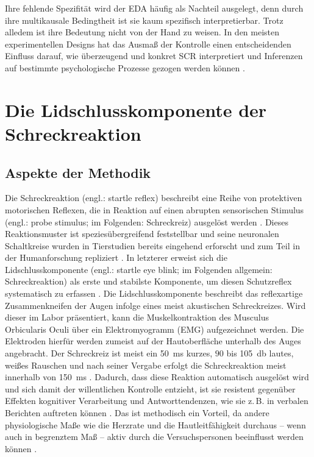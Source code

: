 		Ihre fehlende Spezifität wird der EDA häufig als Nachteil ausgelegt, denn durch ihre multikausale Bedingtheit ist sie kaum spezifisch interpretierbar. Trotz alledem ist ihre Bedeutung nicht von der Hand zu weisen. In den meisten experimentellen Designs hat das Ausmaß der Kontrolle einen entscheidenden Einfluss darauf, wie überzeugend und konkret SCR interpretiert und Inferenzen auf bestimmte psychologische Prozesse gezogen werden können \parencite{DAWSON2007b}. 
		
		


\section{Die Lidschlusskomponente der Schreckreaktion}		\label{startle}
		
	\subsection{Aspekte der Methodik}				\label{startlemethods}
		
		Die Schreckreaktion (engl.: startle reflex) beschreibt eine Reihe von protektiven motorischen Reflexen, die in Reaktion auf einen abrupten sensorischen Stimulus (engl.: probe stimulus; im Folgenden: Schreckreiz) ausgelöst werden \parencite{LANDIS1939}. Dieses Reaktionsmuster ist speziesübergreifend feststellbar und seine neuronalen Schaltkreise wurden in Tierstudien bereits eingehend erforscht und zum Teil in der Humanforschung repliziert \parencite[für eine Übersichtsarbeit siehe][]{DAVIS2006}. In letzterer erweist sich die Lidschlusskomponente (engl.: startle eye blink; im Folgenden allgemein: Schreckreaktion) als erste und stabilste Komponente, um diesen Schutzreflex systematisch zu erfassen \parencite{LANG1990}. Die Lidschlusskomponente beschreibt das reflexartige Zusammenkneifen der Augen infolge eines meist akustischen Schreckreizes. Wird dieser im Labor präsentiert, kann die Muskelkontraktion des Musculus Orbicularis Oculi über ein Elektromyogramm (EMG) aufgezeichnet werden. Die Elektroden hierfür werden zumeist auf der Hautoberfläche unterhalb des Auges angebracht. Der Schreckreiz ist meist ein \SI{50}{\milli\second} kurzes, $90$ bis \SI{105}{\decibel} lautes, weißes Rauschen und nach seiner Vergabe erfolgt die Schreckreaktion meist innerhalb von \SI{150}{\milli\second} \parencite{BLUMENTHAL2005}.
		Dadurch, dass diese Reaktion automatisch ausgelöst wird und sich damit der willentlichen Kontrolle entzieht, ist sie resistent gegenüber Effekten kognitiver Verarbeitung und Antworttendenzen, wie sie z.\,B. in verbalen Berichten auftreten können \parencite{LIPP2006, GRILLON2003}. Das ist methodisch ein Vorteil, da andere physiologische Maße wie die Herzrate und die Hautleitfähigkeit durchaus – wenn auch in begrenztem Maß -- aktiv durch die Versuchspersonen beeinflusst werden können \parencite[z.\,B. mit Beeinflussung der Atmung;][]{LONSDORF2017fc}.
		
